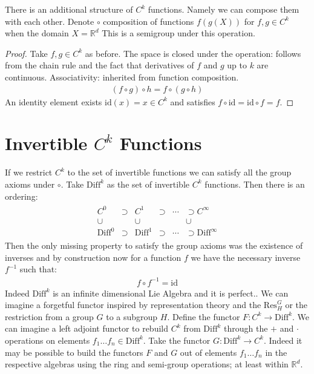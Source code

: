 \documentclass[10pt, oneside]{article}
\newcommand{\R}{\mathbb{R}}
\begin{document}
  There is an additional structure of $C^k$ functions. Namely we can compose them with each other. Denote $\circ$ composition of functions $f(g(X))$ for $f,g \in C^k$ when the domain $X=\R^d$
  This is a semigroup under this operation.
  \begin{proof}
     Take $f,g \in C^k$ as before. The space is closed under the operation: follows from the chain rule and the fact that derivatives of $f$ and $g$ up to $k$ are continuous.
     Associativity: inherited from function composition.
     \begin{align*}
        (f \circ g) \circ h = f \circ (g \circ h)
     \end{align*}
     An identity element exists $\text{id}(x) = x \in C^k$ and satisfies $f \circ \text{id} = \text{id} \circ f = f$.
  \end{proof}
\section*{Invertible $C^k$ Functions}
  If we restrict $C^k$ to the set of invertible functions we can satisfy all the group axioms under $\circ$.
  Take $\text{Diff}^k$ as the set of invertible $C^k$ functions. Then there is an ordering:
  \begin{align*}
     \begin{array}{cccccc}
        C^0 & \supset & C^1 & \supset & \cdots & \supset C^\infty \\
        \cup & & \cup & & & \cup \\
        \text{Diff}^0 & \supset & \text{Diff}^1 & \supset & \cdots & \supset \text{Diff}^\infty
\end{array}
  \end{align*}
  Then the only missing property to satisfy the group axioms was the existence of inverses and by construction now for a function $f$ we have the necessary inverse $f^{-1}$ such that:
  \begin{align*}
     f \circ f^{-1} = \text{id}
  \end{align*}
  Indeed $\text{Diff}^k$ is an infinite dimensional Lie Algebra and it is perfect.\cite{Banyaga1997}. We can imagine a forgetful functor inspired by representation theory and the $\text{Res}^G_H$ or the restriction from a group $G$ to a subgroup $H$.
  Define the functor $F: C^k \to \text{Diff}^k$. We can imagine a left adjoint functor to rebuild $C^k$ from $\text{Diff}^k$ through the $+$ and $\cdot$ operations on elements $f_1 \dots f_n \in \text{Diff}^k$. Take the functor $G: \text{Diff}^k \to C^k$.
  Indeed it may be possible to build the functors $F$ and $G$ out of elements $f_1 \dots f_n$ in the respective algebras using the ring and semi-group operations; at least within $\R^d$.
\end{document}
